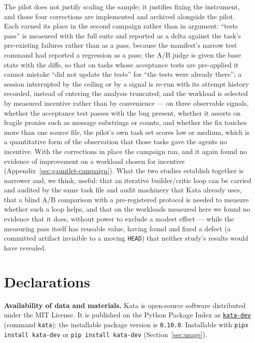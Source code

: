 \documentclass{sbc2019}%
\begin{document}
The pilot does not justify scaling the sample; it justifies fixing the
instrument, and those four corrections are implemented and archived alongside
the pilot. Each earned its place in the second campaign rather than in
argument: ``tests pass'' is measured with the full suite and reported as a
delta against the task's pre-existing failures rather than as a pass, because
the manifest's narrow test command had reported a regression as a pass; the
A/B judge is given the base state with the diffs, so that on tasks whose
acceptance tests are pre-applied it cannot mistake ``did not update the tests''
for ``the tests were already there''; a session interrupted by the ceiling or
by a signal is re-run with its attempt history recorded, instead of entering
the analysis truncated; and the workload is selected by measured incentive
rather than by convenience --- on three observable signals, whether the
acceptance test passes with the bug present, whether it asserts on fragile
proxies such as message substrings or counts, and whether the fix touches more
than one source file, the pilot's own task set scores low or medium, which is a
quantitative form of the observation that those tasks gave the agents no
incentive. With the corrections in place the campaign ran, and it again found no
evidence of improvement on a workload chosen for incentive
(Appendix~\ref{sec:gauntlet-campaign}). What the two studies
establish together is narrower and, we think, useful: that an iterative
builder/critic loop can be carried and audited by the same task file and audit
machinery that Kata already uses, that a blind A/B comparison with a
pre-registered protocol is needed to measure whether such a loop helps,
and that on the workloads measured here we found no evidence that it does, without power to exclude a modest effect --- while the measuring
pass itself has reusable value, having found and fixed a defect (a committed
artifact invisible to a moving \texttt{HEAD}) that neither study's results
would have revealed.

\section*{Declarations}
\label{sec:declarations}

\noindent\textbf{Availability of data and materials.}
Kata is open-source software distributed under the MIT License. It is
published on the Python Package Index as
\href{https://pypi.org/project/kata-dev/}{\texttt{kata-dev}} (command
\texttt{kata}); the installable package version is \texttt{0.10.0}.
Installable with \texttt{pipx install kata-dev} or \texttt{pip install
kata-dev} (Section~\ref{sec:usage}).
\end{document}
